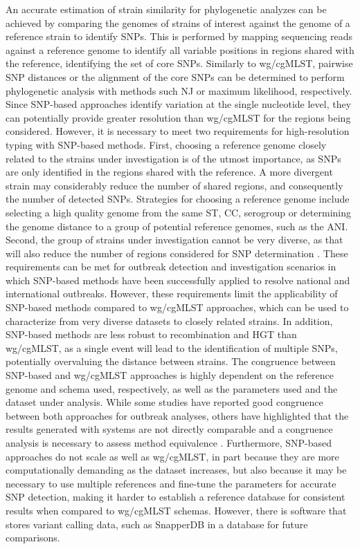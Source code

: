 An accurate estimation of strain similarity for phylogenetic analyzes can be achieved by comparing the genomes of strains of interest against the genome of a reference strain to identify \ac{SNPs}. This is performed by mapping sequencing reads against a reference genome to identify all variable positions in regions shared with the reference, identifying the set of core \ac{SNP}s. Similarly to \ac{wg/cgMLST}, pairwise \ac{SNP} distances or the alignment of the core \ac{SNP}s can be determined to perform phylogenetic analysis with methods such \ac{NJ} or maximum likelihood, respectively. Since SNP-based approaches identify variation at the single nucleotide level, they can potentially provide greater resolution than \ac{wg/cgMLST} for the regions being considered. However, it is necessary to meet two requirements for high-resolution typing with SNP-based methods. First, choosing a reference genome closely related to the strains under investigation is of the utmost importance, as \ac{SNP}s are only identified in the regions shared with the reference. A more divergent strain may considerably reduce the number of shared regions, and consequently the number of detected \ac{SNP}s. Strategies for choosing a reference genome include selecting a high quality genome from the same \ac{ST}, \ac{CC}, serogroup or determining the genome distance to a group of potential reference genomes, such as the \ac{ANI}. Second, the group of strains under investigation cannot be very diverse, as that will also reduce the number of regions considered for \ac{SNP} determination \cite{jolley_bigsdb_2010}. These requirements can be met for outbreak detection and investigation scenarios in which SNP-based methods have been successfully applied to resolve national and international outbreaks. However, these requirements limit the applicability of SNP-based methods compared to \ac{wg/cgMLST} approaches, which can be used to characterize from very diverse datasets to closely related strains. In addition, SNP-based methods are less robust to recombination and \ac{HGT} than \ac{wg/cgMLST}, as a single event will lead to the identification of multiple \ac{SNP}s, potentially overvaluing the distance between strains. The congruence between SNP-based and \ac{wg/cgMLST} approaches is highly dependent on the reference genome and schema used, respectively, as well as the parameters used and the dataset under analysis. While some studies have reported good congruence between both approaches for outbreak analyses, others have highlighted that the results generated with systems are not directly comparable and a congruence analysis is necessary to assess method equivalence \cite{mixao}. Furthermore, SNP-based approaches do not scale as well as \ac{wg/cgMLST}, in part because they are more computationally demanding as the dataset increases, but also because it may be necessary to use multiple references and fine-tune the parameters for accurate SNP detection, making it harder to establish a reference database for consistent results when compared to \ac{wg/cgMLST} schemas. However, there is software that stores variant calling data, such as SnapperDB \cite{} in a database for future comparisons.

